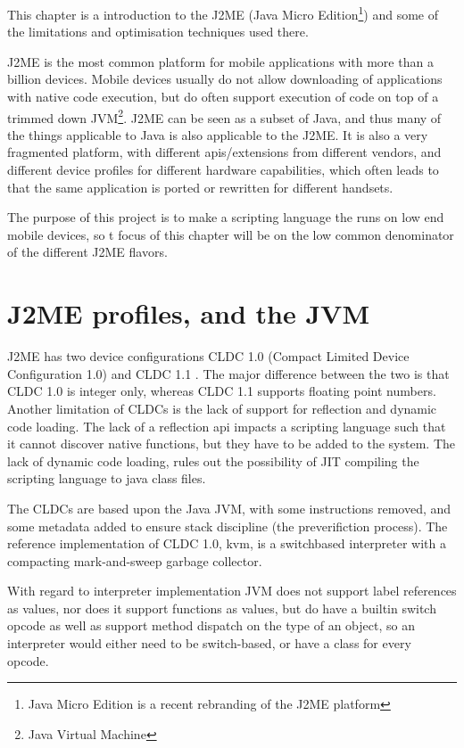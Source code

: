 This chapter is a introduction to the J2ME (Java Micro Edition\footnote{Java Micro Edition is a recent rebranding of the J2ME platform}) and some of the limitations and optimisation techniques used there.

J2ME is the most common platform for mobile applications with more than a billion devices\cite{billionj2me}.
Mobile devices usually do not allow downloading of applications with native code execution, but do often support execution of code on top of a trimmed down JVM\footnote{Java Virtual Machine}. J2ME can be seen as a subset of Java, and thus many of the things applicable to Java is also applicable to the J2ME.
It is also a very fragmented platform, with different apis/extensions from different vendors, and different device profiles for different hardware capabilities, which often leads to that the same application is ported or rewritten for different handsets.

The purpose of this project is to make a scripting language the runs on low end mobile devices, so t focus of this chapter will be on the low common denominator of the different J2ME flavors.

\section{J2ME profiles, and the JVM}
J2ME has two device configurations CLDC 1.0 (Compact Limited Device Configuration 1.0)\cite{cldc10}  and CLDC 1.1 \cite{cldc11}. The major difference between the two is that CLDC 1.0 is integer only, whereas CLDC 1.1 supports floating point numbers. 
Another limitation of CLDCs is the lack of support for reflection and dynamic code loading. 
The lack of a reflection api impacts a scripting language such that it cannot discover native functions, but they have to be added to the system.
The lack of dynamic code loading, rules out the possibility of JIT compiling the scripting language to java class files.

The CLDCs are based upon the Java JVM\cite{jvmref}, with some instructions removed, and some metadata added to ensure stack discipline (the preverifiction process).
The reference implementation of CLDC 1.0, kvm, is a switchbased interpreter with a compacting mark-and-sweep garbage collector\cite{kvm,kvm-src}.

With regard to interpreter implementation JVM does not support label references as values, nor does it support functions as values, but do have a builtin switch opcode as well as support method dispatch on the type of an object, so an interpreter would either need to be switch-based, or have a class for every opcode.

